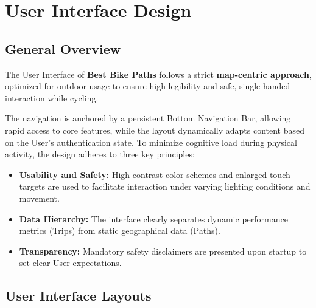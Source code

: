 

\chapter{User Interface Design}
\section{General Overview}
The User Interface of \textbf{Best Bike Paths} follows a strict \textbf{map-centric approach}, optimized for outdoor usage to ensure high legibility and safe, single-handed interaction while cycling. 

\noindent
The navigation is anchored by a persistent Bottom Navigation Bar, allowing rapid access to core features, while the layout dynamically adapts content based on the User's authentication state. To minimize cognitive load during physical activity, the design adheres to three key principles:
\begin{itemize}[noitemsep]
    \item \textbf{Usability and Safety:} High-contrast color schemes and enlarged touch targets are used to facilitate interaction under varying lighting conditions and movement.
    \item \textbf{Data Hierarchy:} The interface clearly separates dynamic performance metrics (Trips) from static geographical data (Paths).
    \item \textbf{Transparency:} Mandatory safety disclaimers are presented upon startup to set clear User expectations.
\end{itemize}


\section{User Interface Layouts}
